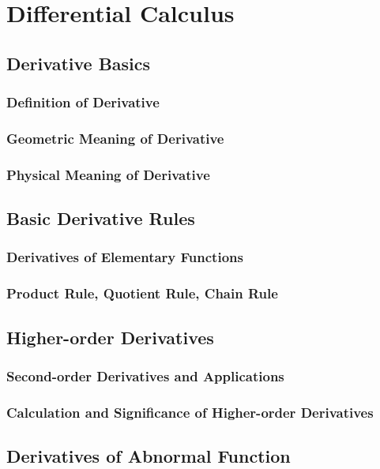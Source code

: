 \chapterspaceabove{6.75cm} 
\chapterspacebelow{7.25cm} 
\chapter{Differential Calculus}

    \section{Derivative Basics}
        \subsection{Definition of Derivative}
        \subsection{Geometric Meaning of Derivative}
        \subsection{Physical Meaning of Derivative}

    \section{Basic Derivative Rules}
        \subsection{Derivatives of Elementary Functions}
        \subsection{Product Rule, Quotient Rule, Chain Rule}

    \section{Higher-order Derivatives}
        \subsection{Second-order Derivatives and Applications}
        \subsection{Calculation and Significance of Higher-order Derivatives}

    \section{Derivatives of Abnormal Function}
